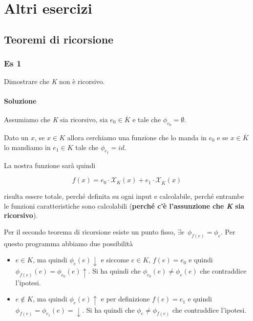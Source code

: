 
\chapter{Altri esercizi}

\section{Teoremi di ricorsione}

\subsection{Es 1}

Dimostrare che \textit{K} non è ricorsivo.

\subsubsection{Soluzione}

Assumiamo che \textit{K} sia ricorsivo, sia $e_0 \in \overline{K}$ e tale che $\phi_{e_0} = \emptyset$.

Dato un $x$, se $x \in K$ allora cerchiamo una funzione che lo manda in $e_0$ e se $x \in \overline{K}$ lo mandiamo in $e_1 \in K$ tale che $\phi_{e_1} = id$.

La nostra funzione sarà quindi 

$$
f(x) = e_0 \cdot \mathcal{X}_{K}(x) + e_1 \cdot \mathcal{X}_{\overline{K}}(x)
$$

risulta essere totale, perché definita su ogni input e calcolabile, perché entrambe le funzioni caratteristiche sono calcolabili (\textbf{perché c'è l'assunzione che \textit{K} sia ricorsivo}).

Per il secondo teorema di ricorsione esiste un punto fisso, $\exists e \:\: \phi_{f(e)} = \phi_e$.
Per questo programma abbiamo due possibilità

\begin{itemize}
	\item $e \in K$, ma quindi $\phi_{e}(e) \downarrow$ e siccome $e \in K$, $f(e) = e_0$ e quindi $\phi_{f(e)}(e) = \phi_{e_0}(e) \uparrow$. Si ha quindi che $ \phi_{e_0}(e) \neq \phi_{e}(e)$ che contraddice l'ipotesi.
	\item $e \notin K$, ma quindi $\phi_{e}(e) \uparrow$ e per definizione $f(e) = e_1$ e quindi $\phi_{f(e)} = \phi_{e_1}(e) = \downarrow$. Si ha quindi che $\phi_e \neq \phi_{f(e)}$ che contraddice l'ipotesi.
\end{itemize}

